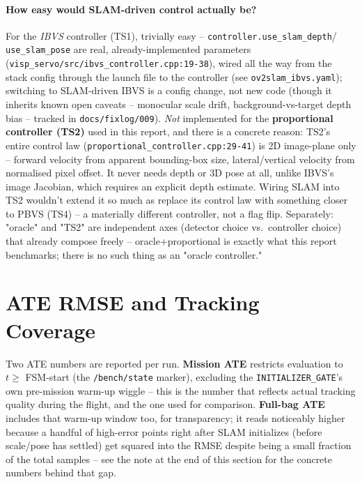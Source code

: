 \documentclass[11pt]{article}
\begin{document}
\paragraph{How easy would SLAM-driven control actually be?} For the
\emph{IBVS} controller (TS1), trivially easy -- \texttt{controller.use\_slam\_depth}/
\texttt{use\_slam\_pose} are real, already-implemented parameters
(\texttt{visp\_servo/src/ibvs\_controller.cpp:19-38}), wired all the way from
the stack config through the launch file to the controller (see
\texttt{ov2slam\_ibvs.yaml}); switching to SLAM-driven IBVS is a config change,
not new code (though it inherits known open caveats -- monocular scale drift,
background-vs-target depth bias -- tracked in \texttt{docs/fixlog/009}).
\emph{Not} implemented for the \textbf{proportional controller (TS2)} used in
this report, and there is a concrete reason: TS2's entire control law
(\texttt{proportional\_controller.cpp:29-41}) is 2D image-plane only -- forward
velocity from apparent bounding-box size, lateral/vertical velocity from
normalised pixel offset. It never needs depth or 3D pose at all, unlike IBVS's
image Jacobian, which requires an explicit depth estimate. Wiring SLAM into TS2
wouldn't extend it so much as replace its control law with something closer to
PBVS (TS4) -- a materially different controller, not a flag flip. Separately:
"oracle" and "TS2" are independent axes (detector choice vs.\ controller
choice) that already compose freely -- oracle+proportional is exactly what
this report benchmarks; there is no such thing as an "oracle controller."

\section{ATE RMSE and Tracking Coverage}

Two ATE numbers are reported per run. \textbf{Mission ATE} restricts evaluation
to $t \geq$ FSM-start (the \texttt{/bench/state} marker), excluding the
\texttt{INITIALIZER\_GATE}'s own pre-mission warm-up wiggle -- this is the number
that reflects actual tracking quality during the flight, and the one used for
comparison. \textbf{Full-bag ATE} includes that warm-up window too, for
transparency; it reads noticeably higher because a handful of high-error points
right after SLAM initializes (before scale/pose has settled) get squared into
the RMSE despite being a small fraction of the total samples -- see the note at
the end of this section for the concrete numbers behind that gap.
\end{document}
